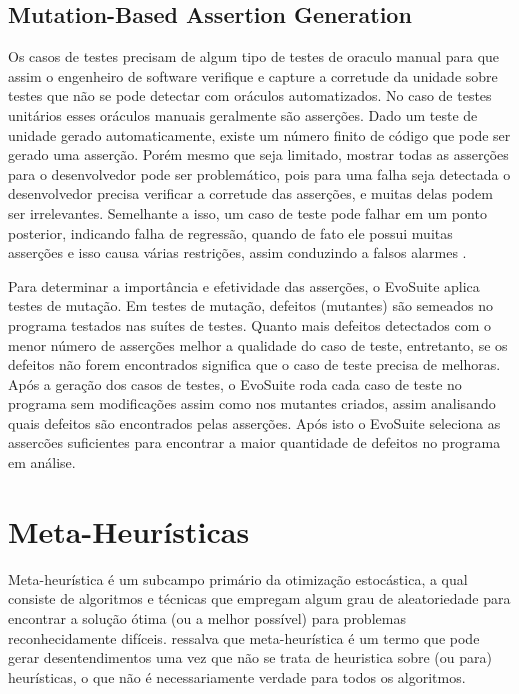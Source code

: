 \documentclass[12pt,a4paper]{article}
\begin{document}
\subsection{Mutation-Based Assertion Generation}

Os casos de testes precisam de algum tipo de testes de oraculo manual para que assim o engenheiro de software verifique e capture a corretude da unidade sobre testes que não se pode detectar com oráculos automatizados. No caso de testes unitários esses oráculos manuais geralmente são asserções. Dado um teste de unidade gerado automaticamente, existe um número finito de código que pode ser gerado uma asserção. Porém mesmo que seja limitado, mostrar todas as asserções para o desenvolvedor pode ser problemático, pois para uma falha seja detectada o desenvolvedor precisa verificar a corretude das asserções, e muitas delas podem ser irrelevantes. Semelhante a isso, um caso de teste pode falhar em um ponto posterior, indicando falha de regressão, quando de fato ele possui muitas asserções e isso causa várias restrições, assim conduzindo a falsos alarmes \cite{fraser2011evosuite}.

Para determinar a importância e efetividade das asserções, o EvoSuite aplica testes de mutação. Em testes de mutação, defeitos (mutantes) são semeados no programa testados nas suítes de testes. Quanto mais defeitos detectados com o menor número de asserções melhor a qualidade do caso de teste, entretanto, se os defeitos não forem encontrados significa que o caso de teste precisa de melhoras. Após a geração dos casos de testes, o EvoSuite roda cada caso de teste no programa sem modificações assim como nos mutantes criados, assim analisando quais defeitos são encontrados pelas asserções. Após isto o EvoSuite seleciona as assercões suficientes para encontrar a maior quantidade de defeitos no programa em análise.


\newpage

\section{Meta-Heurísticas} 

Meta-heurística é um subcampo primário da otimização estocástica, a qual consiste de algoritmos e técnicas que empregam algum grau de aleatoriedade para encontrar a solução ótima (ou a
melhor possível) para problemas reconhecidamente difíceis. \citeauthor{luke2009essentials} \cite{luke2009essentials} ressalva que meta-heurística é um termo que pode gerar desentendimentos
uma vez que não se trata de heuristica sobre (ou para) heurísticas, o que não é necessariamente verdade para todos os algoritmos.  
\end{document}
